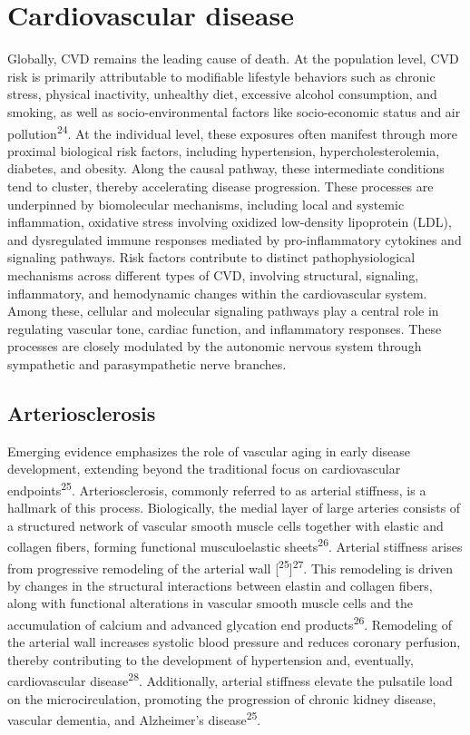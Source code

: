 \documentclass[
  a4paper,
  headsepline=true,
  open=any]{scrbook}
\begin{document}
\hypertarget{cardiovascular-disease}{%
\section{Cardiovascular disease}\label{cardiovascular-disease}}

Globally, CVD remains the leading cause of death. At the population
level, CVD risk is primarily attributable to modifiable lifestyle
behaviors such as chronic stress, physical inactivity, unhealthy diet,
excessive alcohol consumption, and smoking, as well as
socio-environmental factors like socio-economic status and air
pollution\textsuperscript{24}. At the individual level, these exposures
often manifest through more proximal biological risk factors, including
hypertension, hypercholesterolemia, diabetes, and obesity. Along the
causal pathway, these intermediate conditions tend to cluster, thereby
accelerating disease progression. These processes are underpinned by
biomolecular mechanisms, including local and systemic inflammation,
oxidative stress involving oxidized low-density lipoprotein (LDL), and
dysregulated immune responses mediated by pro-inflammatory cytokines and
signaling pathways. Risk factors contribute to distinct
pathophysiological mechanisms across different types of CVD, involving
structural, signaling, inflammatory, and hemodynamic changes within the
cardiovascular system. Among these, cellular and molecular signaling
pathways play a central role in regulating vascular tone, cardiac
function, and inflammatory responses. These processes are closely
modulated by the autonomic nervous system through sympathetic and
parasympathetic nerve branches.

\hypertarget{arteriosclerosis}{%
\subsection{Arteriosclerosis}\label{arteriosclerosis}}

Emerging evidence emphasizes the role of vascular aging in early disease
development, extending beyond the traditional focus on cardiovascular
endpoints\textsuperscript{25}. Arteriosclerosis, commonly referred to as
arterial stiffness, is a hallmark of this process. Biologically, the
medial layer of large arteries consists of a structured network of
vascular smooth muscle cells together with elastic and collagen fibers,
forming functional musculoelastic sheets\textsuperscript{26}. Arterial
stiffness arises from progressive remodeling of the arterial wall
{[}\textsuperscript{25}{]}\textsuperscript{27}. This remodeling is
driven by changes in the structural interactions between elastin and
collagen fibers, along with functional alterations in vascular smooth
muscle cells and the accumulation of calcium and advanced glycation end
products\textsuperscript{26}. Remodeling of the arterial wall increases
systolic blood pressure and reduces coronary perfusion, thereby
contributing to the development of hypertension and, eventually,
cardiovascular disease\textsuperscript{28}. Additionally, arterial
stiffness elevate the pulsatile load on the microcirculation, promoting
the progression of chronic kidney disease, vascular dementia, and
Alzheimer's disease\textsuperscript{25}.
\end{document}
